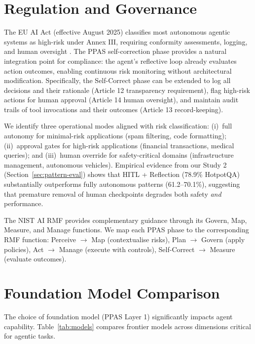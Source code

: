 \documentclass[review]{elsarticle}
\theoremstyle{definition}
\begin{document}
\section{Regulation and Governance}\label{sec:governance}

The EU AI Act \citep{euaiact2024} (effective August 2025) classifies most autonomous agentic systems as high-risk under Annex III, requiring conformity assessments, logging, and human oversight \citep{smuha2021eu}. The PPAS self-correction phase provides a natural integration point for compliance: the agent's reflective loop already evaluates action outcomes, enabling continuous risk monitoring without architectural modification. Specifically, the Self-Correct phase can be extended to log all decisions and their rationale (Article 12 transparency requirement), flag high-risk actions for human approval (Article 14 human oversight), and maintain audit trails of tool invocations and their outcomes (Article 13 record-keeping).

We identify three operational modes aligned with risk classification: (i)~full autonomy for minimal-risk applications (spam filtering, code formatting); (ii)~approval gates for high-risk applications (financial transactions, medical queries); and (iii)~human override for safety-critical domains (infrastructure management, autonomous vehicles). Empirical evidence from our Study 2 (Section~\ref{sec:pattern-eval}) shows that HITL + Reflection (78.9\% HotpotQA) substantially outperforms fully autonomous patterns (61.2--70.1\%), suggesting that premature removal of human checkpoints degrades both safety \emph{and} performance.

The NIST AI RMF \citep{nist2023ai} provides complementary guidance through its Govern, Map, Measure, and Manage functions. We map each PPAS phase to the corresponding RMF function: Perceive $\rightarrow$ Map (contextualise risks), Plan $\rightarrow$ Govern (apply policies), Act $\rightarrow$ Manage (execute with controls), Self-Correct $\rightarrow$ Measure (evaluate outcomes).

\section{Foundation Model Comparison}\label{sec:models}

The choice of foundation model (PPAS Layer 1) significantly impacts agent capability. Table~\ref{tab:models} compares frontier models across dimensions critical for agentic tasks.
\end{document}
